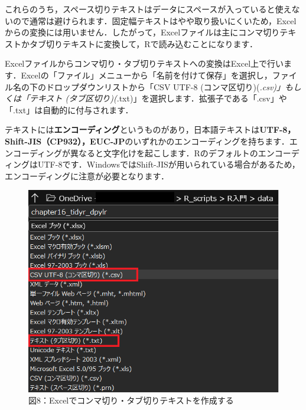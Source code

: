 \documentclass[
  letterpaper,
  DIV=11,
  numbers=noendperiod]{scrreprt}
\begin{document}
これらのうち，スペース切りテキストはデータにスペースが入っていると使えないので通常は避けられます．固定幅テキストはやや取り扱いにくいため，Excelからの変換には用いません．したがって，Excelファイルは主にコンマ切りテキストかタブ切りテキストに変換して，Rで読み込むことになります．

Excelファイルからコンマ切り・タブ切りテキストへの変換はExcel上で行います．Excelの「ファイル」メニューから「名前を付けて保存」を選択し，ファイル名の下のドロップダウンリストから「CSV
UTF-8 (コンマ区切り)(\emph{.csv)」もしくは「テキスト
(タブ区切り)(}.txt)」を選択します．拡張子である「.csv」や「.txt」は自動的に付与されます．

\begin{tcolorbox}[enhanced jigsaw, left=2mm, colframe=quarto-callout-tip-color-frame, opacitybacktitle=0.6, colbacktitle=quarto-callout-tip-color!10!white, opacityback=0, leftrule=.75mm, coltitle=black, bottomtitle=1mm, titlerule=0mm, bottomrule=.15mm, rightrule=.15mm, toptitle=1mm, breakable, arc=.35mm, toprule=.15mm, colback=white, title=\textcolor{quarto-callout-tip-color}{\faLightbulb}\hspace{0.5em}{エンコーディング}]

テキストには\textbf{エンコーディング}というものがあり，日本語テキストは\textbf{UTF-8，Shift-JIS（CP932），EUC-JP}のいずれかのエンコーディングを持ちます．エンコーディングが異なると文字化けを起こします．RのデフォルトのエンコーディングはUTF-8です．WindowsではShift-JISが用いられている場合があるため，エンコーディングに注意が必要となります．

\end{tcolorbox}

\begin{figure}

{\centering \includegraphics{././image/excel_changeformats.png}

}

\caption{図8：Excelでコンマ切り・タブ切りテキストを作成する}

\end{figure}
\end{document}
